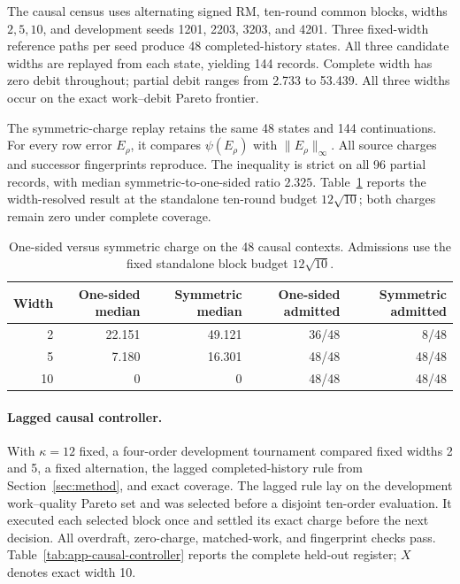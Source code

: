 The causal census uses alternating signed RM, ten-round common blocks, widths
$2,5,10$, and development seeds 1201, 2203, 3203, and 4201.  Three fixed-width
reference paths per seed produce 48 completed-history states.  All three
candidate widths are replayed from each state, yielding 144 records.  Complete
width has zero debit throughout; partial debit ranges from 2.733 to 53.439.
All three widths occur on the exact work--debit Pareto frontier.

The symmetric-charge replay retains the same 48 states and 144 continuations.
For every row error $E_\rho$, it compares $\psi(E_\rho)$ with
$\lVert E_\rho\rVert_\infty$.  All source charges and successor fingerprints
reproduce.  The inequality is strict on all 96 partial records, with median
symmetric-to-one-sided ratio $2.325$.  Table~\ref{tab:app-symmetric-charge}
reports the width-resolved result at the standalone ten-round budget
$12\sqrt{10}$; both charges remain zero under complete coverage.

\begin{table}[h]
\caption{One-sided versus symmetric charge on the 48 causal contexts.
Admissions use the fixed standalone block budget $12\sqrt{10}$.}
\label{tab:app-symmetric-charge}
\centering\small
\begin{tabular}{@{}rrrrr@{}}
\toprule
Width & One-sided median & Symmetric median & One-sided admitted & Symmetric admitted \\
\midrule
2  & 22.151 & 49.121 & 36/48 & 8/48 \\
5  &  7.180 & 16.301 & 48/48 & 48/48 \\
10 &  0     &  0     & 48/48 & 48/48 \\
\bottomrule
\end{tabular}
\end{table}

\paragraph{Lagged causal controller.}
With $\kappa=12$ fixed, a four-order development tournament compared fixed
widths 2 and 5, a fixed alternation, the lagged completed-history rule from
Section~\ref{sec:method}, and exact coverage.  The lagged rule lay on the
development work--quality Pareto set and was selected before a disjoint
ten-order evaluation.  It executed each selected block once and settled its
exact charge before the next decision.  All overdraft, zero-charge,
matched-work, and fingerprint checks pass.  Table~\ref{tab:app-causal-controller}
reports the complete held-out register; $X$ denotes exact width 10.

